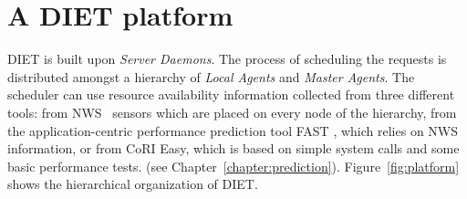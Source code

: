 
\chapter{A DIET platform}
\label{ch:description}

\textsc{DIET} is built upon \emph{Server Daemons}. The process of
scheduling the requests is distributed amongst a hierarchy of
\emph{Local Agents} and \emph{Master Agents}. The scheduler can use
resource availability information collected from three different tools:
from NWS~\cite{WSH99} sensors which are placed on every node of the hierarchy,
from the application-centric performance prediction tool \textsc{FAST}
\cite{Qui02}, which relies on NWS information,
or from CoRI Easy, which is based on simple system calls and some basic
performance tests. (see Chapter~\ref{chapter:prediction}).
Figure~\ref{fig:platform} shows the hierarchical organization of
DIET.

